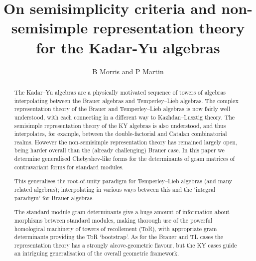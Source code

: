 \documentclass{article}
\title{
On semisimplicity criteria and non-semisimple representation theory for 
the Kadar-Yu algebras}
\author{B Morris and P Martin}   %
\numberwithin{equation}{subsection}
\begin{document}
\maketitle
\begin{abstract}
    The Kadar--Yu algebras are a physically motivated sequence of towers of algebras interpolating between the Brauer algebras and Temperley--Lieb algebras. 
    The complex representation theory of the Brauer and Temperley--Lieb algebras is now fairly well understood, with each connecting in a different way to Kazhdan--Lusztig theory. 
    The semisimple representation theory of the KY algebras is also understood, and thus interpolates, for example, between the double-factorial and Catalan combinatorial realms. However the non-semisimple representation theory has remained largely open, being harder overall than the (already challenging) Brauer case. 
    In this paper we determine generalised Chebyshev-like forms for the determinants of gram matrices 
    of contravariant forms for standard modules. 

    This generalises the root-of-unity paradigm for Temperley--Lieb algebras (and many related algebras); interpolating in various ways between this and the `integral paradigm' for Brauer algebras. 
    
    The standard module gram determinants give 
    a huge amount of information about morphisms between standard modules, making thorough use of the powerful homological machinery of towers of recollement (ToR), with 
    appropriate gram determinants providing the ToR `bootstrap'. As for the Brauer and TL cases the representation theory has a strongly alcove-geometric flavour, but the KY cases guide an intriguing generalisation of the overall geometric framework.  
\end{abstract}
\newpage 
\tableofcontents 




%



\newpage 



\appendix
\newcommand{\texdd}{tex2}
\newcommand{\xfigdd}{tex2/xfig-bratelli5}
\newcommand{\xfigGST}{tex2/xfig-gramdetbyGST}
\vspace{1cm} \newpage 
\end{document}
